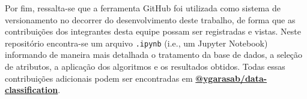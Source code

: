 \documentclass[12pt]{article}
\begin{document}
Por fim, ressalta-se que a ferramenta GitHub foi utilizada como sistema de versionamento no decorrer do desenvolvimento deste trabalho, de forma que as contribuições dos integrantes desta equipe possam ser registradas e vistas. Neste repositório encontra-se um arquivo \texttt{.ipynb} (i.e., um Jupyter Notebook) informando de maneira mais detalhada o tratamento da base de dados, a seleção de atributos, a aplicação dos algoritmos e os resultados obtidos. Todas essas contribuições adicionais podem ser encontradas em \textbf{\href{https://github.com/ygarasab/data-classification}{@ygarasab/data-classification}}.




\end{document}
